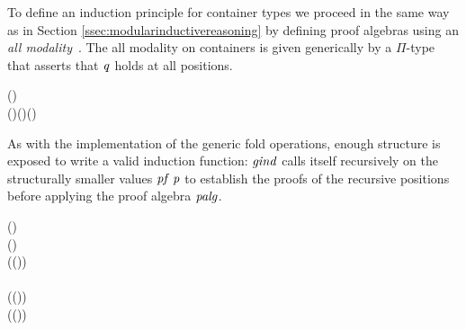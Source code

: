 To define an induction principle for container types we proceed in the
same way as in Section \ref{ssec:modularinductivereasoning} by
defining proof algebras using an \emph{all
modality}~\cite{benke:universes}. The all modality on containers is
given generically by a $\Pi$-type that asserts that \ensuremath{\Varid{q}} holds at all
positions.
\begin{hscode}\SaveRestoreHook
{}%
%
%
\>[3]{}\mathbin{::}(\mathbin{::}\to {})\to {}\;\;\to {}\<[E]%
\\
\>[3]{}\;\;(\;\;)\mathrel{=}\forall (\mathbin{::}\;\;)\hsforall {}\;(\;){}\<[E]%
\ColumnHook
\end{hscode}\resethooks
As with the implementation of the generic fold operations, enough
structure is exposed to write a valid induction function: \ensuremath{\Varid{gind}} calls
itself recursively on the structurally smaller values \ensuremath{\Varid{pf}\;\Varid{p}} to
establish the proofs of the recursive positions before applying the
proof algebra \ensuremath{\Varid{palg}}.
\begin{hscode}\SaveRestoreHook
{}%
%
%
%
%
%
\>[3]{}\mathbin{::}{}\<[12]%
\>[12]{}\forall (\<[27]%
\>[27]{}\mathbin{::})\hsforall \to {}\<[E]%
\\
\>[12]{}\forall (\<[27]%
\>[27]{}\mathbin{::}\;\to {})\hsforall \to {}\<[E]%
\\
\>[12]{}\forall (\<[27]%
\>[27]{}\mathbin{::}\forall {}\hsforall {}\;\;\to {}\;(\;))\hsforall \to {}\<[E]%
\\
\>[12]{}\forall {}\hsforall {}\;\<[E]%
\\
\>[3]{}\;\;\;\;(\;(\;\;))\mathrel{=}{}\<[E]%
\\
\>[3]{}\<[5]%
\>[5]{}\;(\lambda {}\to {}\;\;\;\;(\;)){}\<[E]%
\ColumnHook
\end{hscode}\resethooks


